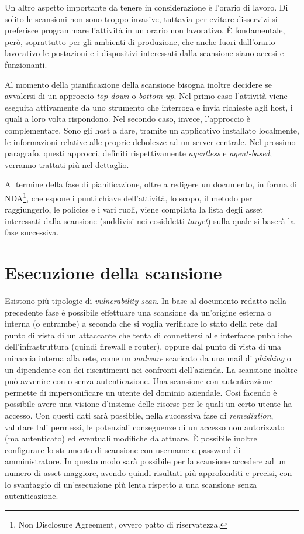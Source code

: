 \documentclass[target=bach,aauheader=]{thud}
\begin{document}
Un altro aspetto importante da tenere in considerazione è l’orario di lavoro. Di solito le scansioni non sono troppo invasive, tuttavia per evitare disservizi si preferisce programmare l’attività in un orario non lavorativo. È fondamentale, però, soprattutto per gli ambienti di produzione, che anche fuori dall’orario lavorativo le postazioni e i dispositivi interessati dalla scansione siano accesi e funzionanti.

Al momento della pianificazione della scansione bisogna inoltre decidere se avvalersi di un approccio \textit{top-down} o \textit{bottom-up}. Nel primo caso l’attività viene eseguita attivamente da uno strumento che interroga e invia richieste agli host, i quali a loro volta rispondono. Nel secondo caso, invece, l’approccio è complementare. Sono gli host a dare, tramite un applicativo installato localmente, le informazioni relative alle proprie debolezze ad un server centrale. Nel prossimo paragrafo, questi approcci, definiti rispettivamente \textit{agentless} e \textit{agent-based}, verranno trattati più nel dettaglio.

Al termine della fase di pianificazione, oltre a redigere un documento, in forma di NDA\footnote{Non Disclosure Agreement, ovvero patto di riservatezza.}, che espone i punti chiave dell’attività, lo scopo, il metodo per raggiungerlo, le policies e i vari ruoli, viene compilata la lista degli asset interessati dalla scansione (suddivisi nei cosiddetti \textit{target}) sulla quale si baserà la fase successiva.


\section{Esecuzione della scansione}
Esistono più tipologie di \textit{vulnerability scan}. In base al documento redatto nella precedente fase è possibile effettuare una scansione da un’origine esterna o interna (o entrambe) a seconda che si voglia verificare lo stato della rete dal punto di vista di un attaccante che tenta di connettersi alle interfacce pubbliche dell’infrastruttura (quindi firewall e router), oppure dal punto di vista di una minaccia interna alla rete, come un \textit{malware} scaricato da una mail di \textit{phishing} o un dipendente con dei risentimenti nei confronti dell’azienda. La scansione inoltre può avvenire con o senza autenticazione. Una scansione con autenticazione permette di impersonificare un utente del dominio aziendale. Così facendo è possibile avere una visione d’insieme delle risorse per le quali un certo utente ha accesso. Con questi dati sarà possibile, nella successiva fase di \textit{remediation}, valutare tali permessi, le potenziali conseguenze di un accesso non autorizzato (ma autenticato) ed eventuali modifiche da attuare. È possibile inoltre configurare lo strumento di scansione con username e password di amministratore. In questo modo sarà possibile per la scansione accedere ad un numero di asset maggiore, avendo quindi risultati più approfonditi e precisi, con lo svantaggio di un’esecuzione più lenta rispetto a una scansione senza autenticazione.
\end{document}

